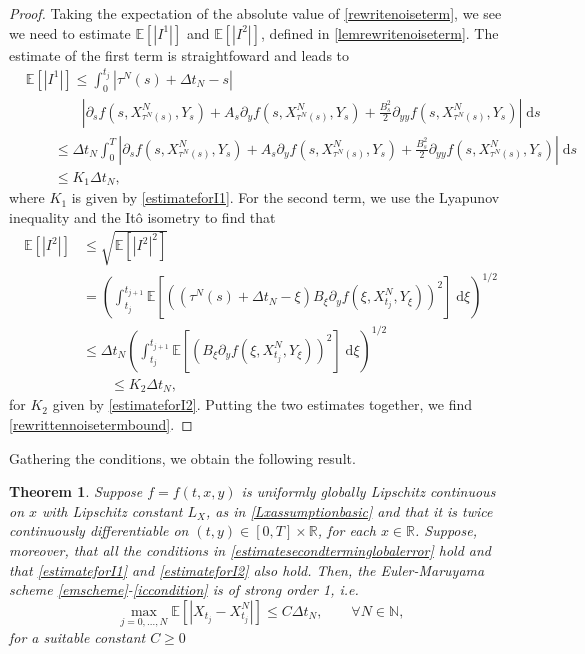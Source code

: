\documentclass[reqno,12pt]{amsart}
\theoremstyle{plain}%
\newtheorem{thm}{Theorem}[section]
\theoremstyle{definition}
\begin{document}
\begin{proof}
    Taking the expectation of the absolute value of \eqref{rewritenoiseterm}, we see we need to estimate $\mathbb{E}[|I^1|]$ and $\mathbb{E}[|I^2|]$, defined in \cref{lemrewritenoiseterm}. The estimate of the first term is straightfoward and leads to
    \begin{align*}
        & \mathbb{E}[|I^1|] \leq \int_0^{t_j} |\tau^N(s) + \Delta t_N - s| \\
        & \qquad \qquad \left|\partial_s f(s, X_{\tau^N(s)}^N, Y_s) + A_s \partial_y f(s, X_{\tau^N(s)}^N, Y_s)  + \frac{B_s^2}{2}\partial_{yy}f(s, X_{\tau^N(s)}^N, Y_s) \right| \;\mathrm{d}s \\
        & \qquad \leq \Delta t_N \int_0^{T}\left|\partial_s f(s, X_{\tau^N(s)}^N, Y_s) + A_s \partial_y f(s, X_{\tau^N(s)}^N, Y_s)  + \frac{B_s^2}{2}\partial_{yy}f(s, X_{\tau^N(s)}^N, Y_s) \right| \;\mathrm{d}s \\
        & \qquad \leq K_1 \Delta t_N,
    \end{align*}
    where $K_1$ is given by \eqref{estimateforI1}. For the second term, we use the Lyapunov inequality and the It\^o isometry to find that
    \begin{align*}
        \mathbb{E}[|I^2|] & \leq \sqrt{\mathbb{E}[|I^2|^2]} \\
        & = \left(\int_{t_j}^{t_{j+1}}  \mathbb{E}\left[\left((\tau^N(s) + \Delta t_N - \xi) B_\xi \partial_y f(\xi, X_{t_j}^N, Y_\xi)\right)^2\right] \;\mathrm{d}\xi \right)^{1/2} \\
        & \leq \Delta t_N \left(\int_{t_j}^{t_{j+1}}  \mathbb{E}\left[\left(B_\xi \partial_y f(\xi, X_{t_j}^N, Y_\xi)\right)^2\right] \;\mathrm{d}\xi \right)^{1/2} \\
        & \qquad \leq K_2 \Delta t_N,
    \end{align*}
    for $K_2$ given by \eqref{estimateforI2}. Putting the two estimates together, we find \eqref{rewrittennoisetermbound}.
\end{proof}

Gathering the conditions, we obtain the following result.
\begin{thm}
    \label{thmforItonoise}
    Suppose $f=f(t, x, y)$ is uniformly globally Lipschitz continuous on $x$ with Lipschitz constant $L_X$, as in \eqref{Lxassumptionbasic} and that it is twice continuously differentiable on $(t, y)\in [0, T]\times \mathbb{R}$, for each $x\in \mathbb{R}$. Suppose, moreover, that all the conditions in \cref{estimatesecondterminglobalerror} hold and that \eqref{estimateforI1} and \eqref{estimateforI2} also hold. Then, the Euler-Maruyama scheme \eqref{emscheme}-\eqref{iccondition} is of strong order 1, i.e.
    \begin{equation}
      \label{thmitogeneralboundstrongorder}
        \max_{j=0, \ldots, N}\mathbb{E}\left[ \left| X_{t_j} - X_{t_j}^N \right| \right] \leq C \Delta t_N, \qquad \forall N \in \mathbb{N},
    \end{equation}
    for a suitable constant $C \geq 0$
\end{thm}
\end{document}

